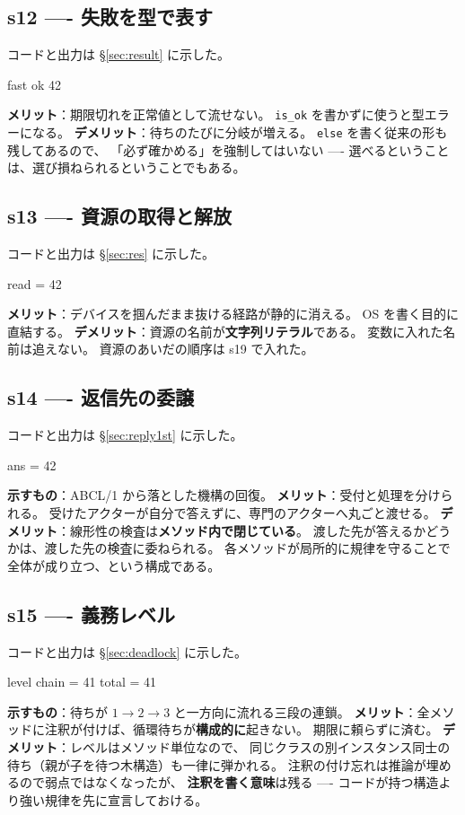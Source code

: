 \documentclass[11pt,a4paper]{ltjsarticle}
\theoremstyle{definition}
\theoremstyle{remark}
\begin{document}
\subsection{s12 ---- 失敗を型で表す}
コードと出力は \S\ref{sec:result} に示した。
\begin{term}
fast ok 42
\end{term}
\textbf{メリット}：期限切れを正常値として流せない。
\texttt{is\_ok} を書かずに使うと型エラーになる。
\textbf{デメリット}：待ちのたびに分岐が増える。
\texttt{else} を書く従来の形も残してあるので、
「必ず確かめる」を強制してはいない ---- 選べるということは、選び損ねられるということでもある。

\subsection{s13 ---- 資源の取得と解放}
コードと出力は \S\ref{sec:res} に示した。
\begin{term}
read = 42
\end{term}
\textbf{メリット}：デバイスを掴んだまま抜ける経路が静的に消える。
OS を書く目的に直結する。
\textbf{デメリット}：資源の名前が\textbf{文字列リテラル}である。
変数に入れた名前は追えない。
資源のあいだの順序は s19 で入れた。

\subsection{s14 ---- 返信先の委譲}
コードと出力は \S\ref{sec:reply1st} に示した。
\begin{term}
ans = 42
\end{term}
\textbf{示すもの}：ABCL/1 から落とした機構の回復。
\textbf{メリット}：受付と処理を分けられる。
受けたアクターが自分で答えずに、専門のアクターへ丸ごと渡せる。
\textbf{デメリット}：線形性の検査は\textbf{メソッド内で閉じている}。
渡した先が答えるかどうかは、渡した先の検査に委ねられる。
各メソッドが局所的に規律を守ることで全体が成り立つ、という構成である。

\subsection{s15 ---- 義務レベル}
コードと出力は \S\ref{sec:deadlock} に示した。
\begin{term}
level chain = 41
total = 41
\end{term}
\textbf{示すもの}：待ちが $1 \to 2 \to 3$ と一方向に流れる三段の連鎖。
\textbf{メリット}：全メソッドに注釈が付けば、循環待ちが\textbf{構成的に}起きない。
期限に頼らずに済む。
\textbf{デメリット}：レベルはメソッド単位なので、
同じクラスの別インスタンス同士の待ち（親が子を待つ木構造）も一律に弾かれる。
注釈の付け忘れは推論が埋めるので弱点ではなくなったが、
\textbf{注釈を書く意味}は残る ---- コードが持つ構造より強い規律を先に宣言しておける。
\end{document}
